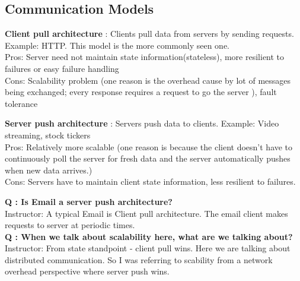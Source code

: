 \documentclass[twoside]{article}
\begin{document}
\subsection{Communication Models}
\begin{description}
\item{ \textbf{Client pull architecture}} : Clients pull data from servers by sending requests. Example: HTTP. This model is the more commonly seen one.\\Pros: Server need not maintain state information(stateless), more resilient to failures or easy failure handling\\Cons: Scalability problem (one reason is the overhead cause by lot of messages being exchanged; every response requires a request to go the server ), fault tolerance
\item{ \textbf{Server push architecture}} : Servers push data to clients. Example: Video streaming, stock tickers\\Pros: Relatively more scalable (one reason is because the client doesn't have to continuously poll the server for fresh data and the server automatically pushes when new data arrives.)\\Cons: Servers have to maintain client state information, less resilient to failures.
\end{description}
\textbf{Q : Is Email a server push architecture?}
\\{Instructor: A typical Email is Client pull architecture. The email client makes requests to server at periodic times.}
\\\textbf{Q : When we talk about scalability here, what are we talking about?}
\\{Instructor: From state standpoint - client pull wins. Here we are talking about distributed communication. So I was referring to scability from a network overhead perspective where server push wins.}
\end{document}
